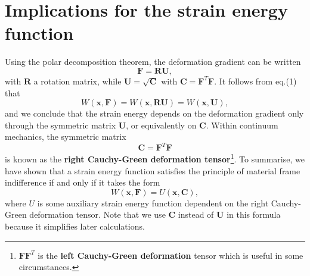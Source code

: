 \documentclass [a4paper,12pt]{paper}
\begin{document}
\section*{Implications for the strain energy function}

Using the polar decomposition theorem, the deformation gradient can be written
\begin{equation}
\mathbf{F} = \mathbf{R}\mathbf{U},
\end{equation}
with $\mathbf{R}$ a rotation matrix, while $\mathbf{U} = \sqrt{\mathbf{C}}$ with $\mathbf{C} = \mathbf{F}^{T}\mathbf{F}$. It follows from eq.(1) that
\begin{equation}
W(\mathbf{x}, \mathbf{F}) = W(\mathbf{x}, \mathbf{R}\mathbf{U}) = W(\mathbf{x}, \mathbf{U}),
\end{equation}
and we conclude that the strain energy depends on the deformation gradient only through the symmetric matrix $\mathbf{U}$,
 or equivalently on $\mathbf{C}$. Within continuum mechanics, the symmetric matrix
\begin{equation}
\mathbf{C} = \mathbf{F}^{T}\mathbf{F}
\end{equation}
is known as the \textbf{right Cauchy-Green deformation tensor}\footnote{$\mathbf{F}\mathbf{F}^T$ is the
 \textbf{left Cauchy-Green deformation} tensor which is useful in some circumstances.}. To summarise, we have shown 
 that a strain energy function satisfies the principle of material frame indifference if and only if it takes the form
\begin{equation}
W(\mathbf{x}, \mathbf{F}) = U(\mathbf{x}, \mathbf{C}),
\end{equation}
where $U$ is some auxiliary strain energy function dependent on the right Cauchy-Green deformation tensor. Note that we use $\mathbf{C}$ instead of $\mathbf{U}$ in this formula because it simplifies later calculations.
\end{document}
